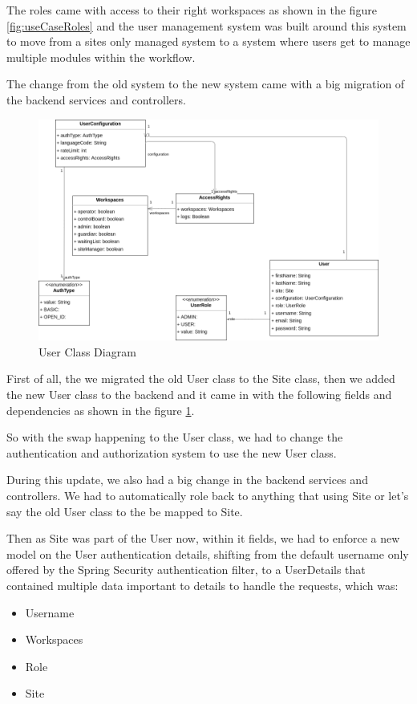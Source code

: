 The roles came with access to their right workspaces as shown in the figure
\ref{fig:useCaseRoles} and the user management system was built around this system to
move from a sites only managed system to a system where users get to manage multiple
modules within the workflow.

The change from the old system to the new system came with a big migration of the backend
services and controllers.

\begin{figure}[!ht]
    \centering
    \includegraphics[width=1\textwidth]{images/userClass.png}
    \caption{\footnotesize{User Class Diagram}}
    \label{fig:userClass}
\end{figure}

First of all, the we migrated the old User class to the Site class, then we added the new
User class to the backend and it came in with the following fields and dependencies as shown
in the figure \ref{fig:userClass}.

So with the swap happening to the User class, we had to change the authentication and
authorization system to use the new User class.

During this update, we also had a big change in the backend services and controllers.
We had to automatically role back to anything that using Site or let's say the old User 
class to the be mapped to Site.

Then as Site was part of the User now, within it fields, we had to enforce a new model 
on the User authentication details, shifting from the default username only offered
by the Spring Security authentication filter, to a UserDetails that contained multiple 
data important to details to handle the requests, which was:
\begin{itemize}
    \item Username
    \item Workspaces
    \item Role
    \item Site
\end{itemize}

